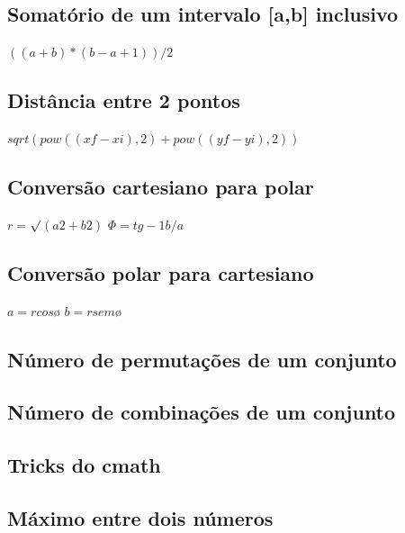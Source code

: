 \documentclass[a4paper,12pt]{article}
\begin{document}
\subsection{Somatório de um intervalo [a,b] inclusivo}

\(((a + b) * (b - a + 1)) / 2\)

\subsection{Distância entre 2 pontos}

\(sqrt(pow((xf-xi),2) + pow((yf-yi),2))\)

\subsection{Conversão cartesiano para polar}

\( r = \)$\surd$\((a 2 + b2)\)\newline
\(\Phi = tg-1 b/a\)

\subsection{Conversão polar para cartesiano}

\( a = r cos ø\) \newline
\( b = r sem ø\)

\subsection{Número de permutações de um conjunto}


\subsection{Número de combinações de um conjunto}


\subsection{Tricks do cmath}


\subsection{Máximo entre dois números}
\end{document}

